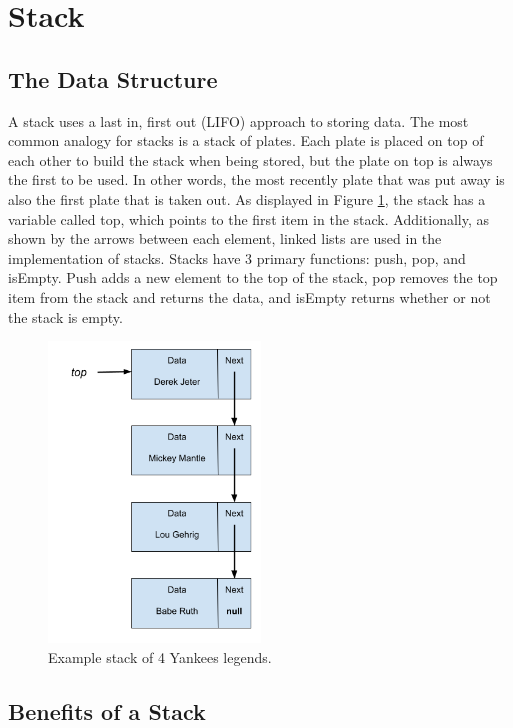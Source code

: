 \documentclass[letterpaper, 10pt,DIV=13]{scrartcl}
\numberwithin{equation}{section} %
\numberwithin{figure}{section} %
\numberwithin{table}{section} %
\begin{document}
\section{Stack}
\subsection{The Data Structure}\label{stackDataStructure}
A stack uses a last in, first out (LIFO) approach to storing data. The most common analogy for stacks is a stack of plates. Each plate is
placed on top of each other to build the stack when being stored, but the plate on top is always the first to be used. In other words, the most recently plate
that was put away is also the first plate that is taken out. As displayed in Figure \ref{figure:stack}, the stack has a variable called top, which points to the first item in the stack.
Additionally, as shown by the arrows between each element, linked lists are used in the implementation of stacks. Stacks have 3 primary functions: push, pop, and isEmpty.
Push adds a new element to the top of the stack, pop removes the top item from the stack and returns the data, and isEmpty returns whether or not the stack is empty.

\begin{figure}[ht] 
    \centering 
    \includegraphics[height=8cm]{stack}
    \caption{Example stack of 4 Yankees legends.}
    \label{figure:stack}
 \end{figure}

\subsection{Benefits of a Stack}
\end{document}
